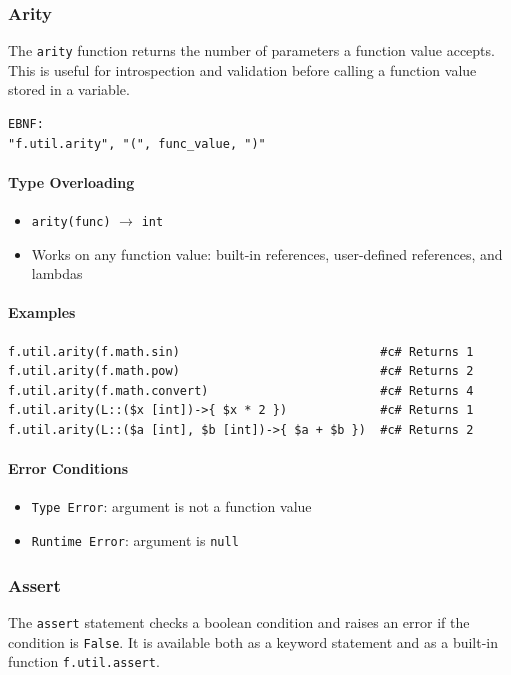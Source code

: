 \subsubsection{Arity}
The \texttt{arity} function returns the number of parameters a function value accepts. This is useful for introspection and validation before calling a function value stored in a variable.
\begin{verbatim}
EBNF:
"f.util.arity", "(", func_value, ")"
\end{verbatim}

\paragraph{Type Overloading}
\begin{itemize}
\item \texttt{arity(func)} $\rightarrow$ \texttt{int}
\item Works on any function value: built-in references, user-defined references, and lambdas
\end{itemize}

\paragraph{Examples}
\begin{verbatim}
f.util.arity(f.math.sin)                            #c# Returns 1
f.util.arity(f.math.pow)                            #c# Returns 2
f.util.arity(f.math.convert)                        #c# Returns 4
f.util.arity(L::($x [int])->{ $x * 2 })             #c# Returns 1
f.util.arity(L::($a [int], $b [int])->{ $a + $b })  #c# Returns 2
\end{verbatim}

\paragraph{Error Conditions}
\begin{itemize}
\item \texttt{Type Error}: argument is not a function value
\item \texttt{Runtime Error}: argument is \texttt{null}
\end{itemize}

\subsubsection{Assert}
\label{sec:assert}
The \texttt{assert} statement checks a boolean condition and raises an error if the condition is \texttt{False}. It is available both as a keyword statement and as a built-in function \texttt{f.util.assert}.

